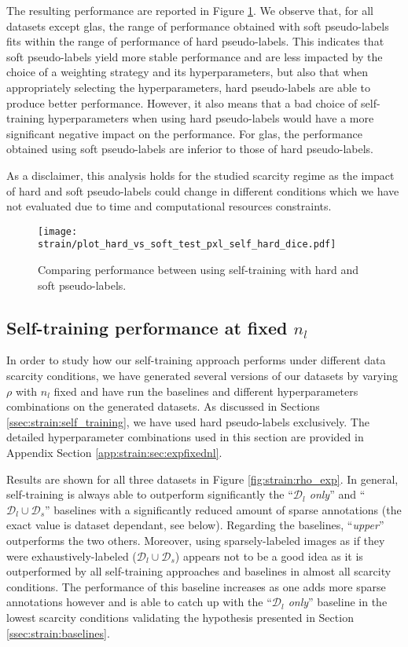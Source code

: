 The resulting performance are reported in Figure \ref{fig:strain:hard_vs_soft}. We observe that, for all datasets except \acrshort{glas}, the range of performance obtained with soft pseudo-labels fits within the range of performance of hard pseudo-labels. This indicates that soft pseudo-labels yield more stable performance and are less impacted by the choice of a weighting strategy and its hyperparameters, but also that when appropriately selecting the hyperparameters, hard pseudo-labels are able to produce better performance. However, it also means that a bad choice of self-training hyperparameters when using hard pseudo-labels would have a more significant negative impact on the performance. For \acrshort{glas}, the performance obtained using soft pseudo-labels are inferior to those of hard pseudo-labels. 

As a disclaimer, this analysis holds for the studied scarcity regime as the impact of hard and soft pseudo-labels could change in different conditions which we have not evaluated due to time and computational resources constraints. 

\begin{figure}
  \centering
  \texttt{[image: strain/plot\_hard\_vs\_soft\_test\_pxl\_self\_hard\_dice.pdf]}
  \caption{Comparing performance between using self-training with hard and soft pseudo-labels.}
  \label{fig:strain:hard_vs_soft}
\end{figure}

\subsection{Self-training performance at fixed $n_l$}
\label{ssec:strain:fixednl}

In order to study how our self-training approach performs under different data scarcity conditions, we have generated several versions of our datasets by varying $\rho$ with $n_l$ fixed and have run the baselines and different hyperparameters combinations on the generated datasets. As discussed in Sections \ref{ssec:strain:self_training}, we have used hard pseudo-labels exclusively. The detailed hyperparameter combinations used in this section are provided in Appendix Section \ref{app:strain:sec:expfixednl}.

Results are shown for all three datasets in Figure \ref{fig:strain:rho_exp}. In general, self-training is always able to outperform significantly the ``\textit{$\mathcal{D}_l$ only}'' and ``$\mathcal{D}_l \cup \mathcal{D}_s$'' baselines with a significantly reduced amount of sparse annotations (the exact value is dataset dependant, see below). Regarding the baselines, ``\textit{upper}''  outperforms the two others. Moreover, using sparsely-labeled images as if they were exhaustively-labeled (\ie $\mathcal{D}_l \cup \mathcal{D}_s$) appears not to be a good idea as it is outperformed by all self-training approaches and baselines in almost all scarcity conditions. The performance of this baseline increases as one adds more sparse annotations however and is able to catch up with the ``\textit{$\mathcal{D}_l$ only}'' baseline in the lowest scarcity conditions validating the hypothesis presented in Section \ref{ssec:strain:baselines}. 

